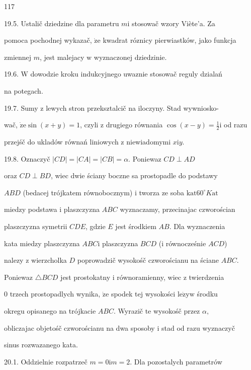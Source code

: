 \documentclass[a4paper,12pt]{article}
\begin{document}
117

19.5. Ustalič dziedzine dla parametru $m\mathrm{i}$ stosowač wzory Viète'a. Za

pomoca pochodnej wykazač, $\dot{\mathrm{z}}\mathrm{e}$ kwadrat róznicy pierwiastków, jako funkcja

zmiennej $m$, jest malejacy $\mathrm{w}$ wyznaczonej dziedzinie.

19.6. $\mathrm{W}$ dowodzie kroku indukcyjnego uwaznie stosowač reguly dzialań

na potegach.

19.7. Sumy $\mathrm{z}$ lewych stron przeksztalcič na iloczyny. Stad wywniosko-

wač, $\dot{\mathrm{z}}\mathrm{e}\sin(x+y)=1$, czyli $\mathrm{z}$ drugiego równania $\displaystyle \cos(x-y)=\frac{1}{2}\mathrm{i}$ od razu

przejśč do ukladów równań liniowych $\mathrm{z}$ niewiadomymi $x\mathrm{i}y.$

19.8. Oznaczyč $|CD| = |CA| = |CB| = \alpha$. Poniewaz $CD \perp AD$

oraz $CD \perp BD$, wiec dwie ściany boczne sa prostopadle do podstawy

$ABD$ (bedacej trójkatem równobocznym) $\mathrm{i}$ tworza ze soba $\mathrm{k}\mathrm{a}\mathrm{t} 60^{\circ} K\mathrm{a}\mathrm{t}$

miedzy podstawa $\mathrm{i}$ plaszczyzna $ABC$ wyznaczamy, przecinajac czworościan

plaszczyzna symetrii $CDE$, gdzie $E$ jest środkiem $AB$. Dla wyznaczenia

kata miedzy plaszczyzna $ABC\mathrm{i}$ plaszczyzna $BCD$ ($\mathrm{i}$ równocześnie $ACD$)

nalezy $\mathrm{z}$ wierzcholka $D$ poprowadzič wysokośč czworościanu na ściane $ABC.$

Poniewaz $\triangle BCD$ jest prostokatny $\mathrm{i}$ równoramienny, wiec $\mathrm{z}$ twierdzenia

$0$ trzech prostopadlych wynika, $\dot{\mathrm{z}}\mathrm{e}$ spodek tej wysokości $\mathrm{l}\mathrm{e}\dot{\mathrm{z}}\mathrm{y} \mathrm{w}$ środku

okregu opisanego na trójkacie $ABC$. Wyrazič $\mathrm{t}\mathrm{e}$ wysokośč przez $\alpha,$

obliczajac objetośč czworościanu na dwa sposoby $\mathrm{i}$ stad od razu wyznaczyč

sinus rozwazanego kata.

20.1. Oddzielnie rozpatrzeč $m=0\mathrm{i}m=2$. Dla pozostalych parametrów
\end{document}
